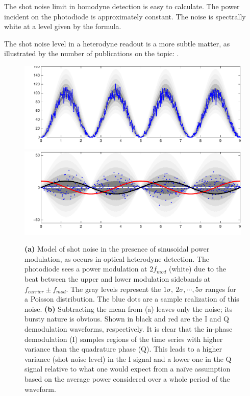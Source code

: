 The shot noise limit in homodyne detection is easy to calculate.  The
power incident on the photodiode is approximately constant.  The noise
is spectrally white at a level given by the formula.

The shot noise level in a heterodyne readout is a more subtle matter,
as illustrated by the number of publications on the topic:
\cite{Niebauer1991Nonstationary, Lyons2000Shot, Mio1992Observation, Meers1991Modulation}.

\begin{figure}
\includegraphics[width=\columnwidth]{figures/cyclostationary-timeseries.pdf}
\includegraphics[width=\columnwidth]{figures/cyclostationary-timeseries2.pdf}
\caption[Illustration of cyclo-stationary shot noise]{\label{fig:cyclostationary-shot-noise} \textbf{(a)} Model of
  shot noise in the presence of sinusoidal power modulation, as occurs
  in optical heterodyne detection.  The photodiode sees a power
  modulation at $2f_{mod}$ (white) due to the beat between the upper
  and lower modulation sidebands at $f_{carrier} \pm f_{mod}$.
  The gray levels represent the $1\sigma,\ 2\sigma,
  \cdots, 5\sigma$ ranges for a Poisson distribution.  The blue dots
  are a sample realization of this noise. \textbf{(b)} Subtracting the
  mean from (a) leaves only the noise; its bursty nature is obvious.
  Shown in black and red are the I and Q demodulation waveforms,
  respectively.  It is clear that the in-phase demodulation (I)
  samples regions of the time series with higher variance than the
  quadrature phase (Q).  This leads to a higher variance (shot noise
  level) in the I signal and a lower one in the Q signal relative to
  what one would expect from a na\"ive assumption based on the average
  power considered over a whole period of the waveform.}
\end{figure}

